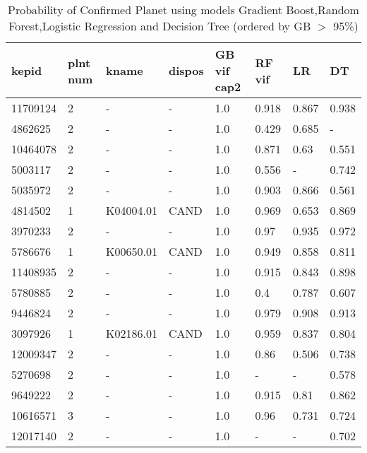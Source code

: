 \begin{table}[!htbp]
 \centering
 \caption{Probability of Confirmed Planet using models Gradient Boost,Random
Forest,Logistic Regression and Decision Tree (ordered by GB $>$ 95\%)}
 \label{dataGBvifcap2RFvifLRDTcreftab} 
  \begin{tabular}
{| 
 p{}| 
 p{}| 
 p{}| 
 p{}| 
 p{}| 
 p{}| 
 p{}| 
 p{}| 
}\hline 
\textbf{kepid} &\textbf{plnt num} &\textbf{kname} &\textbf{dispos} &\textbf{GB vif cap2} &\textbf{RF vif} &\textbf{LR} &\textbf{DT} \\ \hline 
11709124 &2 &- &- &1.0 &0.918 &0.867 &0.938 \\ \hline 
4862625 &2 &- &- &1.0 &0.429 &0.685 &- \\ \hline 
10464078 &2 &- &- &1.0 &0.871 &0.63 &0.551 \\ \hline 
5003117 &2 &- &- &1.0 &0.556 &- &0.742 \\ \hline 
5035972 &2 &- &- &1.0 &0.903 &0.866 &0.561 \\ \hline 
4814502 &1 &K04004.01 &CAND &1.0 &0.969 &0.653 &0.869 \\ \hline 
3970233 &2 &- &- &1.0 &0.97 &0.935 &0.972 \\ \hline 
5786676 &1 &K00650.01 &CAND &1.0 &0.949 &0.858 &0.811 \\ \hline 
11408935 &2 &- &- &1.0 &0.915 &0.843 &0.898 \\ \hline 
5780885 &2 &- &- &1.0 &0.4 &0.787 &0.607 \\ \hline 
9446824 &2 &- &- &1.0 &0.979 &0.908 &0.913 \\ \hline 
3097926 &1 &K02186.01 &CAND &1.0 &0.959 &0.837 &0.804 \\ \hline 
12009347 &2 &- &- &1.0 &0.86 &0.506 &0.738 \\ \hline 
5270698 &2 &- &- &1.0 &- &- &0.578 \\ \hline 
9649222 &2 &- &- &1.0 &0.915 &0.81 &0.862 \\ \hline 
10616571 &3 &- &- &1.0 &0.96 &0.731 &0.724 \\ \hline 
12017140 &2 &- &- &1.0 &- &- &0.702 \\ \hline 

\end{tabular}
\end{table}
